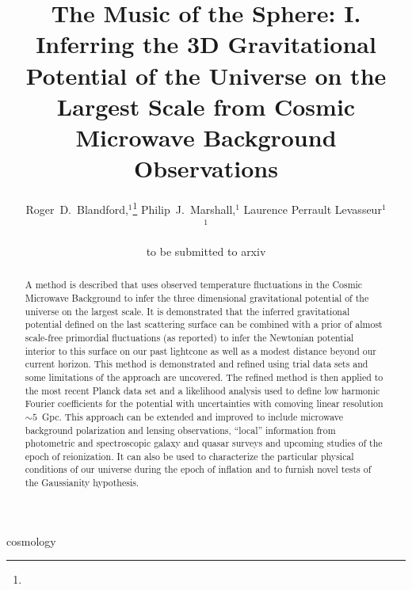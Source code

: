 \documentclass[useAMS,usenatbib,a4paper]{mn2e}
\title[The 3D Potential of the Universe from CMB Data]
{The Music of the Sphere: I. Inferring the 3D Gravitational Potential of the Universe on the Largest Scale from Cosmic Microwave Background Observations}
\author[Blandford et al.]{%
    Roger~D.~Blandford,$^{1}$\thanks{\rdbemail}
    Philip~J.~Marshall,$^{1}$
    Laurence Perrault Levasseur$^{1}$
    \medskip\\
    $^1$\kipac
}
\begin{document}
\date{to be submitted to arxiv}
\pagerange{\pageref{firstpage}--\pageref{lastpage}}

\maketitle

\label{firstpage}
\begin{abstract}
A method is described that uses observed temperature fluctuations in the Cosmic Microwave Background to infer the three dimensional gravitational potential of the universe on the largest scale. It is demonstrated that the inferred gravitational potential defined on the last scattering surface can be combined with a prior of almost scale-free primordial fluctuations (as reported) to infer the Newtonian potential interior to this surface on our past lightcone as well as a modest distance beyond our current horizon. This method is demonstrated and refined using  trial data sets and some limitations of the approach are uncovered. The refined method is then applied to the most recent Planck data set and a likelihood analysis used to define low harmonic Fourier coefficients for the potential with uncertainties with comoving linear resolution $\sim5$~Gpc. This approach can be extended and improved to include microwave background polarization and lensing observations, ``local'' information from photometric and spectroscopic galaxy and quasar surveys and upcoming studies of the epoch of reionization. It can also be used to characterize the particular physical conditions of our universe during the epoch of inflation and to furnish novel tests of the Gaussianity hypothesis.
\end{abstract}
\begin{keywords}
  cosmology
\end{keywords}
\setcounter{footnote}{1}
\end{document}
